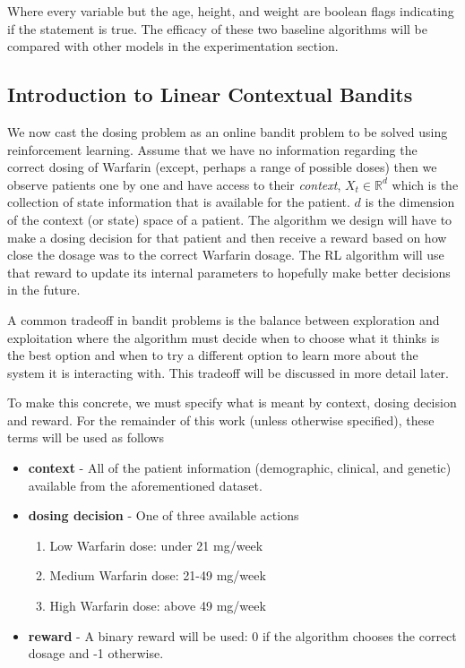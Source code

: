 \documentclass{article}
\begin{document}
Where every variable but the age, height, and weight are boolean flags indicating if the statement is true. The efficacy of these two baseline algorithms will be compared with other models in the experimentation section.

\subsection{Introduction to Linear Contextual Bandits}
We now cast the dosing problem as an online bandit problem to be solved using reinforcement learning. Assume that we have no information regarding the correct dosing of Warfarin (except, perhaps a range of possible doses) then we observe patients one by one and have access to their \textit{context}, $X_t \in \mathbb{R}^d$ which is the collection of state information that is available for the patient. $d$ is the dimension of the context (or state) space of a patient. The algorithm we design will have to make a dosing decision for that patient and then receive a reward based on how close the dosage was to the correct Warfarin dosage. The RL algorithm will use that reward to update its internal parameters to hopefully make better decisions in the future. 

A common tradeoff in bandit problems is the balance between exploration and exploitation where the algorithm must decide when to choose what it thinks is the best option and when to try a different option to learn more about the system it is interacting with. This tradeoff will be discussed in more detail later. 

To make this concrete, we must specify what is meant by context, dosing decision and reward. For the remainder of this work (unless otherwise specified), these terms will be used as follows
\begin{itemize}
    \item \textbf{context} - All of the patient information (demographic, clinical, and genetic) available from the aforementioned dataset. 
    \item \textbf{dosing decision} - One of three available actions
    \begin{enumerate}
        \item Low Warfarin dose: under 21 mg/week
        \item Medium Warfarin dose: 21-49 mg/week
        \item High Warfarin dose: above 49 mg/week
    \end{enumerate}
    \item \textbf{reward} - A binary reward will be used: 0 if the algorithm chooses the correct dosage and -1 otherwise.
\end{itemize}
\end{document}
